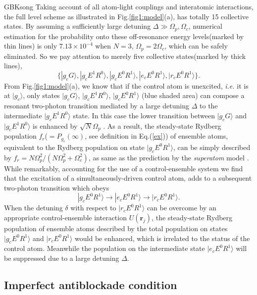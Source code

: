\documentclass{cpbtex}
\begin{document}
\begin{CJK*}{GBK}{song}
Taking account of all atom-light couplings and interatomic interactions, the full level scheme as illustrated in Fig.\ref{fig1:model}(a), has totally 15 collective states. By assuming a sufficiently large detuning $\Delta\gg\Omega_p,\Omega_c$, numerical estimation for the probability onto these off-resonance energy levels(marked by thin lines) is only $7.13\times10^{-4}$ when $N=3$, $\Omega_p=2\Omega_c$, which can be safely eliminated. So we pay attention to merely five collective states(marked by thick lines),
\begin{equation}
    \{|g_cG\rangle,|g_cE^1R^0\rangle,|g_cE^0R^1\rangle,|e_cE^0R^1\rangle,|r_cE^0R^1\rangle\}.
    \label{trr}
\end{equation}
From Fig.\ref{fig1:model}(a), we know that if the control atom is unexcited, {\it i.e.} it is at $|g_c\rangle$, only states $|g_cG\rangle$, $|g_cE^1R^0\rangle$, $|g_cE^0R^1\rangle$ (blue shaded area) can compose a resonant two-photon transition mediated by a large detuning $\Delta$ to the intermediate $|g_cE^1R^0\rangle$ state. In this case the lower transition between $|g_cG\rangle$ and $|g_cE^1R^0\rangle$ is enhanced by $\sqrt{N}\Omega_p$ \cite{PhysRevLett.127.063604}. As a result, the steady-state Rydberg population $f_r$($=P_{g_c}(\infty)$, see definition in Eq.(\ref{ex})) of ensemble atoms, equivalent to the Rydberg population on state $|g_cE^0R^1\rangle$, can be simply described by 
$f_r=N\Omega_p^2/(N\Omega_p^2+\Omega_c^2)$, 
as same as the prediction by the {\it superatom} model \cite{PhysRevLett.113.233002}.
While remarkably, accounting for the use of a control-ensemble system we find that the excitation of a simultaneously-driven control atom, adds to a subsequent two-photon transition which obeys
\begin{equation}
|g_cE^0R^1\rangle\to|e_cE^0R^1\rangle\to|r_cE^0R^1\rangle.
\end{equation}
 When the detuning $\delta$ with respect to $|r_c E^0 R^1\rangle$ can be overcome by an appropriate control-ensemble interaction $U(\bm{r}_j)$, the steady-state Rydberg population of ensemble atoms described by the total population on states $|g_c E^0 R^1\rangle$ and $|r_c E^0 R^1\rangle$ would be enhanced, which is irrelated to the status of the control atom. Meanwhile the population on the intermediate state $|e_c E^0 R^1\rangle$ will be suppressed due to a large detuning $\Delta$. 

 \subsection{Imperfect antiblockade condition}




\end{CJK*}
\end{document}
